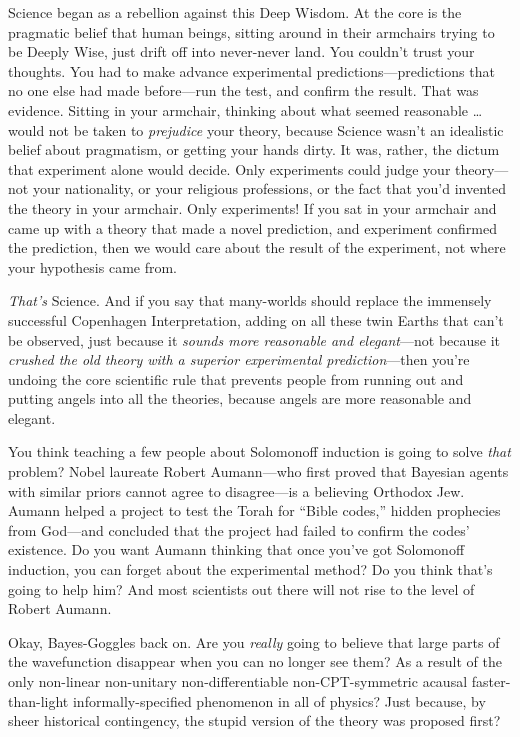{
 Science began as a rebellion against this Deep Wisdom. At the core
is the pragmatic belief that human beings, sitting around in their
armchairs trying to be Deeply Wise, just drift off into never-never
land. You couldn't trust your thoughts. You had to make
advance experimental predictions---predictions that no one else had
made before---run the test, and confirm the result. That was evidence.
Sitting in your armchair, thinking about what seemed reasonable \ldots
would not be taken to \textit{prejudice} your theory, because Science
wasn't an idealistic belief about pragmatism, or
getting your hands dirty. It was, rather, the dictum that experiment
alone would decide. Only experiments could judge your theory---not your
nationality, or your religious professions, or the fact that
you'd invented the theory in your armchair. Only
experiments! If you sat in your armchair and came up with a theory that
made a novel prediction, and experiment confirmed the prediction, then
we would care about the result of the experiment, not where your
hypothesis came from.}

{
 \textit{That's} Science. And if you say that
many-worlds should replace the immensely successful Copenhagen
Interpretation, adding on all these twin Earths that
can't be observed, just because it \textit{sounds more
reasonable and elegant}{}---not because it \textit{crushed the old
theory with a superior experimental prediction}{}---then
you're undoing the core scientific rule that prevents
people from running out and putting angels into all the theories,
because angels are more reasonable and elegant.}

{
 You think teaching a few people about Solomonoff induction is
going to solve \textit{that} problem? Nobel laureate Robert
Aumann---who first proved that Bayesian agents with similar priors
cannot agree to disagree---is a believing Orthodox Jew. Aumann helped a
project to test the Torah for ``Bible
codes,'' hidden prophecies from God---and concluded
that the project had failed to confirm the codes'
existence. Do you want Aumann thinking that once you've
got Solomonoff induction, you can forget about the experimental method?
Do you think that's going to help him? And most
scientists out there will not rise to the level of Robert Aumann.}

{
 Okay, Bayes-Goggles back on. Are you \textit{really} going to
believe that large parts of the wavefunction disappear when you can no
longer see them? As a result of the only non-linear non-unitary
non-differentiable non-CPT-symmetric acausal faster-than-light
informally-specified phenomenon in all of physics? Just because, by
sheer historical contingency, the stupid version of the theory was
proposed first?}

